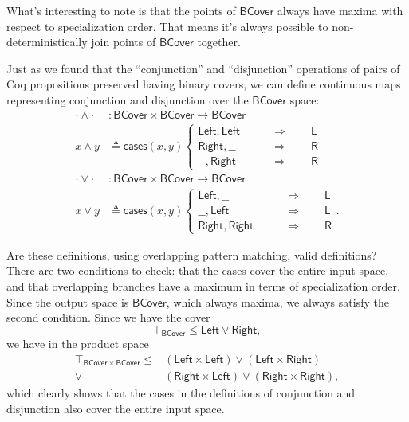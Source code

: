 What's interesting to note is that the points of $\mathsf{BCover}$ always have maxima with respect to specialization order. That means it's always possible to non-deterministically join points of $\mathsf{BCover}$ together.

Just as we found that the ``conjunction'' and ``disjunction'' operations of pairs of Coq propositions preserved having binary covers, we can define continuous maps representing conjunction and disjunction over the $\mathsf{BCover}$ space:
\begin{align*}
\cdot \wedge \cdot &: \mathsf{BCover} \times \mathsf{BCover} \to \mathsf{BCover}
\\ x \wedge y &\triangleq \mathsf{cases}(x, y)
\begin{cases}
\mathsf{Left}, \mathsf{Left}
 \qquad &\Rightarrow \qquad
 \mathsf{L}
\\
\mathsf{Right}, \_\_
 \qquad &\Rightarrow \qquad
 \mathsf{R}
\\
\_\_, \mathsf{Right}
 \qquad &\Rightarrow \qquad
 \mathsf{R}
\end{cases}
\\
\cdot \vee \cdot &: \mathsf{BCover} \times \mathsf{BCover} \to \mathsf{BCover}
\\ x \vee y &\triangleq \mathsf{cases}(x, y)
\begin{cases}
\mathsf{Left}, \_\_
 \qquad &\Rightarrow \qquad
 \mathsf{L}
\\
\_\_, \mathsf{Left}
 \qquad &\Rightarrow \qquad
 \mathsf{L}
\\
 \mathsf{Right}, \mathsf{Right}
 \qquad &\Rightarrow \qquad
 \mathsf{R}
\end{cases}.
\end{align*}

Are these definitions, using overlapping pattern matching, valid definitions? There are two conditions to check: that the cases cover the entire input space, and that overlapping branches have a maximum in terms of specialization order. Since the output space is $\mathsf{BCover}$, which always maxima, we always satisfy the second condition. Since we have the cover
\[
\top_\mathsf{BCover} \le \mathsf{Left} \vee \mathsf{Right},
\]
we have in the product space
\begin{align*}
\top_{\mathsf{BCover} \times \mathsf{BCover}} \le 
  &(\mathsf{Left} \times \mathsf{Left}) \vee (\mathsf{Left} \times \mathsf{Right})
\\ \vee &(\mathsf{Right} \times \mathsf{Left}) \vee (\mathsf{Right} \times \mathsf{Right}),
\end{align*}
which clearly shows that the cases in the definitions of conjunction and disjunction also cover the entire input space.


